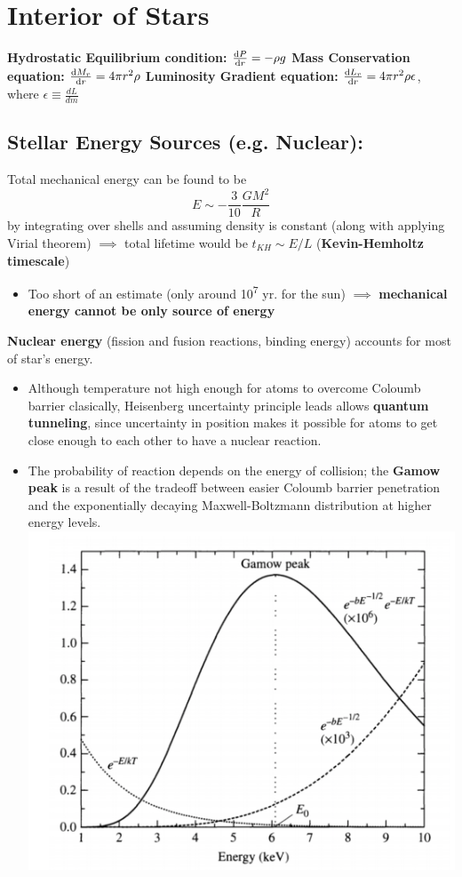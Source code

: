 \documentclass[12pt]{article}
\begin{document}
\section{Interior of Stars}

\textbf{Hydrostatic Equilibrium condition:} $\dv{P}{r} = -\rho g$
\textbf{Mass Conservation equation:} $\dv{M_r}{r} = 4\pi r^2\rho$
\textbf{Luminosity Gradient equation:} $\dv{L_r}{r} = 4\pi r^2\rho\epsilon$, where $\epsilon \equiv \frac{dL}{dm}$

\subsection{Stellar Energy Sources (e.g. Nuclear):}
Total mechanical energy can be found to be $$E \sim -\frac{3}{10}\frac{GM^2}{R}$$ by integrating over shells and assuming density is constant (along with applying Virial theorem) $\implies$ total lifetime would be $t_{KH} \sim E/L$ (\textbf{Kevin-Hemholtz timescale})
\begin{itemize}
    \item Too short of an estimate (only around 10\textsuperscript{7} yr. for the sun) $\implies$ \textbf{mechanical energy cannot be only source of energy}
\end{itemize}

\textbf{Nuclear energy} (fission and fusion reactions, binding energy) accounts for most of star's energy.
\begin{itemize}
    \item Although temperature not high enough for atoms to overcome Coloumb barrier clasically, Heisenberg uncertainty principle leads allows \textbf{quantum tunneling}, since uncertainty in position makes it possible for atoms to get close enough to each other to have a nuclear reaction.
    \item The probability of reaction depends on the energy of collision; the \textbf{Gamow peak} is a result of the tradeoff between easier Coloumb barrier penetration and the exponentially decaying Maxwell-Boltzmann distribution at higher energy levels.\newline
    \includegraphics[scale=0.6]{Figures/GamowPeak.png}
\end{itemize}
\end{document}
